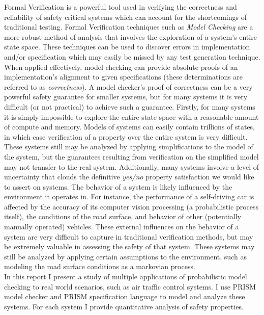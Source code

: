 \documentclass{article}
\begin{document}
Formal Verification is a powerful tool used in verifying the correctness and reliability of safety critical systems which can account for the shortcomings of traditional testing. Formal Verification techniques such as \textit{Model Checking} are a more robust method of analysis that involves the exploration of a system's entire state space. These techniques can be used to discover errors in implementation and/or specification which may easily be missed by any test generation technique. When applied effectively, model checking can provide absolute proofs of an implementation's alignment to given specifications (these determinations are referred to as \textit{correctness}). A model checker's proof of correctness can be a very powerful safety guarantee for smaller systems, but for many systems it is very difficult (or not practical) to achieve such a guarantee. Firstly, for many systems it is simply impossible to explore the entire state space with a reasonable amount of compute and memory. 
Models of systems can easily contain trillions of states, in which case verification of a property over the entire system is very difficult. These systems still may be analyzed by applying simplifications to the model of the system, but the guarantees resulting from verification on the simplified model may not transfer to the real system.
Additionally, many systems involve a level of uncertainty that clouds the definitive \textit{yes/no} property satisfaction we would like to assert on systems. The behavior of a system is likely influenced by the environment it operates in. For instance, the performance of a self-driving car is affected by the accuracy of its computer vision processing (a probabilistic process itself), the conditions of the road surface, and behavior of other (potentially manually operated) vehicles. These external influences on the behavior of a system are very difficult to capture in traditional verification methods, but may be extremely valuable in assessing the safety of that system. These systems may still be analyzed by applying certain assumptions to the environment, such as modeling the road surface conditions as a markovian process.\\

In this report I present a study of multiple applications of probabilistic model checking to real world scenarios, such as air traffic control systems. I use PRISM model checker\cite{KNP11} and PRISM specification language to model and analyze these systems. For each system I provide quantitative analysis of safety properties.\\
\end{document}
